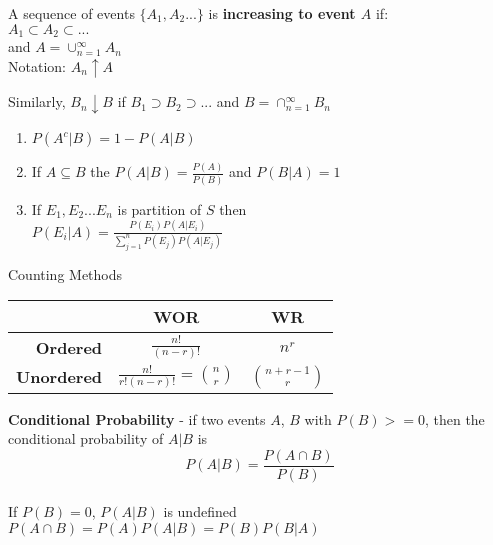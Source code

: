 \documentclass[14pt, oneside, letterpaper]{notes}
\begin{document}
\begin{mydef}
	A sequence of events $\{A_1, A_2 ...\}$ is \textbf{increasing to event $A$} if: \\
	\indent $A_1 \subset A_2 \subset ...$  \\
	\indent and $A = \cup_{n=1}^{\infty} A_n$ \\
	\indent Notation: $A_n \uparrow A$
\end{mydef}

\begin{mydef}
	Similarly, $B_n \downarrow B$ if $B_1 \supset B_2 \supset ... $ and
	$B = \cap_{n=1}^{\infty} B_n$ 
\end{mydef}

\begin{enumerate}
\item $P(A^c|B) = 1 - P(A|B)$
\item If $A \subseteq B$ the $P(A|B) = \frac{P(A)}{P(B)}$
	and $P(B|A) = 1$
\item If ${E_1, E_2 ... E_n}$ is partition of $S$ then \\
	$P(E_i|A) = \frac{P(E_i)P(A|E_i)}
	{\sum_{j=1}^{n}P(E_j)P(A|E_j)}$
\end{enumerate}

%
%
\begin{mydef}
Counting Methods
\begin{table}[h!]
	\begin{tabular}{r|c|c}
		& \textbf{WOR} & \textbf{WR} \\
		\hline
		
		\textbf{Ordered} 
		& $\displaystyle \frac{n!}{(n-r)!} $ 
		& $\displaystyle n^r $ \\
		
		\textbf{Unordered} 
		& $\displaystyle \frac{n!}{r!(n-r)!} 
		= {n \choose r} $ 
		& $\displaystyle {n+r-1 \choose r} $ \\
	\end{tabular}
\end{table}

\end{mydef}

%
%

\begin{mydef}
	\textbf{Conditional Probability} - if two events 
	$A$, $B$ with $P(B) >= 0$, then the conditional 
	probability of $A|B$ is \[P(A|B) = \frac{P(A\cap B)}
	{P(B)}\] \\
	If $P(B) = 0$, $P(A|B)$ is undefined \\
	$P(A \cap B) = P(A)P(A|B) = P(B)P(B|A)$ \\
\end{mydef}
\end{document}
